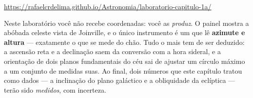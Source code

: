 \documentclass[11pt,a4paper]{article}
\begin{document}
\begin{center}
\url{https://rafaelcrdelima.github.io/Astronomia/laboratorio-capitulo-1a/}
\end{center}

Neste laboratório você não recebe coordenadas: você as \emph{produz}. O painel mostra a abóbada celeste
vista de Joinville, e o único instrumento é um que lê \textbf{azimute e altura} --- exatamente o que se mede
do chão. Tudo o mais tem de ser deduzido: a ascensão reta e a declinação saem da conversão com a hora
sideral, e a orientação de dois planos fundamentais do céu sai de ajustar um círculo máximo a um conjunto
de medidas suas. Ao final, dois números que este capítulo tratou como dados --- a inclinação do plano
galáctico e a obliquidade da eclíptica --- terão sido \emph{medidos}, com incerteza.
\end{document}

